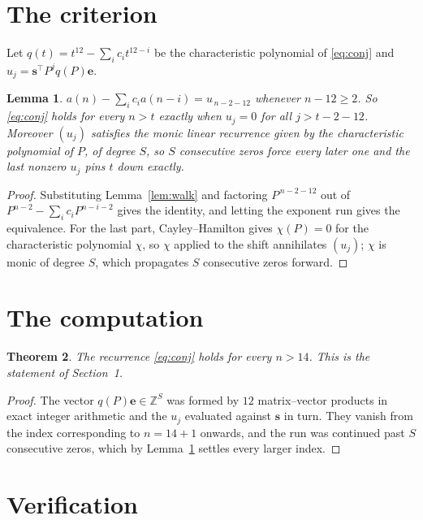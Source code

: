 \documentclass[11pt,a4paper]{article}
\theoremstyle{plain}
\newtheorem{theorem}{Theorem}
\newtheorem{lemma}[theorem]{Lemma}
\theoremstyle{definition}
\begin{document}
\section{The criterion}

Let $q(t)=t^{12}-\sum_i c_i t^{12-i}$ be the characteristic polynomial of
\eqref{eq:conj} and $u_j=\mathbf{s}^{\!\top}P^{j}q(P)\mathbf{e}$.

\begin{lemma}\label{lem:crit}
$a(n)-\sum_i c_i a(n-i)=u_{\,n-2-12}$ whenever $n-12\ge2$. So \eqref{eq:conj}
holds for every $n>t$ exactly when $u_j=0$ for all $j>t-2-12$. Moreover $(u_j)$
satisfies the monic linear recurrence given by the characteristic polynomial of $P$, of
degree $S$, so $S$ consecutive zeros force every later one and the last nonzero $u_j$ pins
$t$ down exactly.
\end{lemma}

\begin{proof}
Substituting Lemma~\ref{lem:walk} and factoring $P^{\,n-2-12}$ out of
$P^{n-2}-\sum_i c_i P^{n-i-2}$ gives the identity, and letting the exponent run gives the
equivalence. For the last part, Cayley--Hamilton gives $\chi(P)=0$ for the characteristic
polynomial $\chi$, so $\chi$ applied to the shift annihilates $(u_j)$; $\chi$ is monic of
degree $S$, which propagates $S$ consecutive zeros forward.
\end{proof}

\section{The computation}

\begin{theorem}
The recurrence \eqref{eq:conj} holds for every $n>14$. This is the statement of
Section~1.
\end{theorem}

\begin{proof}
The vector $q(P)\mathbf{e}\in\mathbb{Z}^{S}$ was formed by $12$ matrix--vector
products in exact integer arithmetic and the $u_j$ evaluated against $\mathbf{s}$ in turn.
They vanish from the index corresponding to $n=14+1$ onwards, and the run was continued
past $S$ consecutive zeros, which by Lemma~\ref{lem:crit} settles every larger index.
\end{proof}

\section{Verification}
\end{document}
